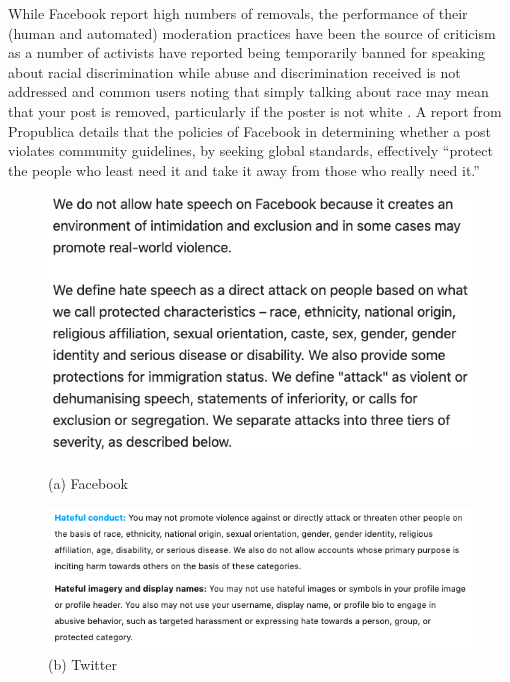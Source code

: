 While Facebook report high numbers of removals, the performance of their (human and automated) moderation practices have been the source of criticism as a number of activists have reported being temporarily banned for speaking about racial discrimination while abuse and discrimination received is not addressed \citep{Sharif:2019} and common users noting that simply talking about race may mean that your post is removed, particularly if the poster is not white \citep{Guynn:2019}. A report from Propublica details that the policies of Facebook in determining whether a post violates community guidelines, by seeking global standards, effectively ``protect the people who least need it and take it away from those who really need it.''\citep{Angwin:2017}

\begin{figure}[!htb]
  \begin{minipage}{0.32\textwidth}
    \includegraphics[width=\linewidth]{Chapter2/Figs/Facebook.png}
    \caption*{(a) Facebook}
  \end{minipage}\hfill
  \begin{minipage}{0.32\textwidth}
    \includegraphics[width=\linewidth]{Chapter2/Figs/Twitter.png}
    \caption*{(b) Twitter}
  \end{minipage}\hfill
  \begin{minipage}{0.32\textwidth}

\end{minipage}
\end{figure}
